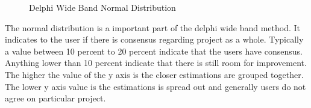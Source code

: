 \begin{itemize}
\begin{figure}[H]
	    	\caption{Delphi Wide Band Normal Distribution}
	    	\label{fig:Delphi Wide Band Normal Distribution}
   	\end{figure}
	The normal distribution is a important part of the delphi wide band method. It indicates to the user if there is consensus regarding project as a whole. Typically a value between 10 percent to 20 percent indicate that the users have consensus. Anything lower than 10 percent indicate that there is still room for improvement. The higher the value of the y axis is the closer estimations are grouped together. The lower y axis value is the estimations is spread out and generally users do not agree on particular project.
\end{itemize}

